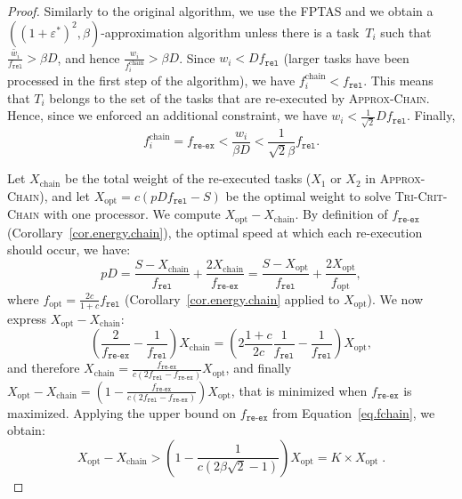 \documentclass[a4paper]{article}
\theoremstyle{plain}
\theoremstyle{definition}
\theoremstyle{remark}
\newcommand{\fr}{\ensuremath{f_{\texttt{rel}}}\xspace}
\newcommand{\freex}{\ensuremath{f_{\texttt{re-ex}}}\xspace}
\newcommand{\approxchain}{\textsc{Ap\-prox-Chain}}
\newcommand{\chain}{\textsc{Tri-Crit-Chain}\xspace}
\begin{document}
\begin{proof}
  Similarly to the original algorithm, we use the FPTAS and we obtain
  a $\left( \left( 1+\varepsilon^* \right)^2,
    \beta\right)$-approxi\-mation algorithm unless there is a task~$T_i$ such
  that $\frac{\tilde{w_i}}{\fr} > \beta D$, and hence
  $\frac{w_i}{f_i^{\text{chain}}} > \beta D$. Since $w_i<D\fr$ (larger
  tasks have been processed in the first step of the algorithm), we
  have $f_i^{\text{chain}}<\fr$.  This means that $T_i$ belongs to the
  set of the tasks that are re-executed by \approxchain.  Hence, since
  we enforced an additional constraint, we have
  $w_i<\frac{1}{\sqrt{2}}D\fr$.  Finally,
\begin{equation}
    \label{eq.fchain}
f^{\text{chain}}_i = \freex < \frac{w_i}{\beta D}< \frac{1}{\sqrt{2} \beta}\fr.
\end{equation}





Let $X_{\text{chain}}$ be the total weight of the re-executed tasks
($X_1$ or $X_2$ in \approxchain), and let $X_{\text{opt}}=c(pD\fr -
S)$ be the optimal weight to solve \chain with one processor. 
We compute $X_{\text{opt}} - X_{\text{chain}}$.  By
definition of $\freex$ (Corollary~\ref{cor.energy.chain}), the optimal
speed at which each re-execution should occur, we have:
\[pD = \frac{S-X_{\text{chain}}}{\fr} +
\frac{2X_{\text{chain}}}{\freex} = \frac{S-X_{\text{opt}}}{\fr} +
\frac{2X_{\text{opt}}}{f_{\text{opt}}}, \]
where $f_{\text{opt}} = \frac{2c}{1+c} \fr$ (Corollary~\ref{cor.energy.chain} 
applied to $X_{\text{opt}}$). We now express $X_{\text{opt}} -
X_{\text{chain}}$: 
$$\left ( \frac{2}{\freex} \!-\! \frac{1}{\fr} \right )\! X_{\text{chain}} =\!
\left ( 2\frac{1+c}{2c}\frac{1}{\fr} \!-\! \frac{1}{\fr} \right ) \!
X_{\text{opt}},$$
and therefore 
$X_{\text{chain}} = \frac{\freex}{c(2\fr - \freex)} X_{\text{opt}}$,
and finally $X_{\text{opt}} - X_{\text{chain}} =\left (1-
  \frac{\freex}{c(2\fr -\freex)} \right) X_{\text{opt}}$, 
that is minimized when $\freex$ is maximized. Applying the upper bound
on $\freex$ from Equation~\eqref{eq.fchain}, we obtain:
\begin{equation*}
    \label{eq.xchain}
X_{\text{opt}} - X_{\text{chain}} > \left (1- \frac{1}{c(2\beta
    \sqrt{2} -1)} \right) X_{\text{opt}} = K\times X_{\text{opt}}\; . 
\end{equation*}


\end{proof}
\end{document}
